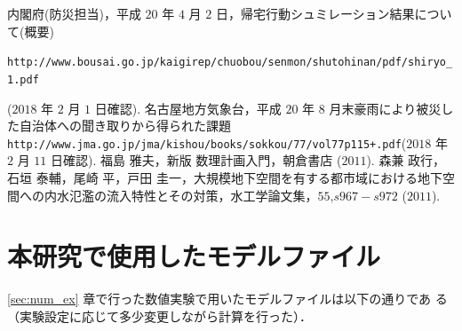 \documentclass[a4paper,12pt,fleqn]{jarticle}
\begin{document}
\begin{thebibliography}{99}
内閣府(防災担当)，平成 $20$ 年 $4$ 月 $2$ 日，帰宅行動シュミレーション結果について(概要)\par \verb|http://www.bousai.go.jp/kaigirep/chuobou/senmon/shutohinan/pdf/shiryo_1.pdf|\par($2018$ 年 $2$ 月 $1$ 日確認).
名古屋地方気象台，平成 $20$ 年 $8$ 月末豪雨により被災した自治体への聞き取りから得られた課題 \verb|http://www.jma.go.jp/jma/kishou/books/sokkou/77/vol77p115+.pdf|($2018$ 年 $2$ 月 $11$ 日確認).
福島 雅夫，新版 数理計画入門，朝倉書店 ($2011$).
森兼 政行，石垣 泰輔，尾崎 平，戸田 圭一，大規模地下空間を有する都市域における地下空間への内水氾濫の流入特性とその対策，水工学論文集，$55$,$s967-s972$ ($2011$).
\end{thebibliography}

\newpage
\appendix
\section{本研究で使用したモデルファイル}

\ref{sec:num_ex} 章で行った数値実験で用いたモデルファイルは以下の通りであ
る（実験設定に応じて多少変更しながら計算を行った）．
\end{document}
